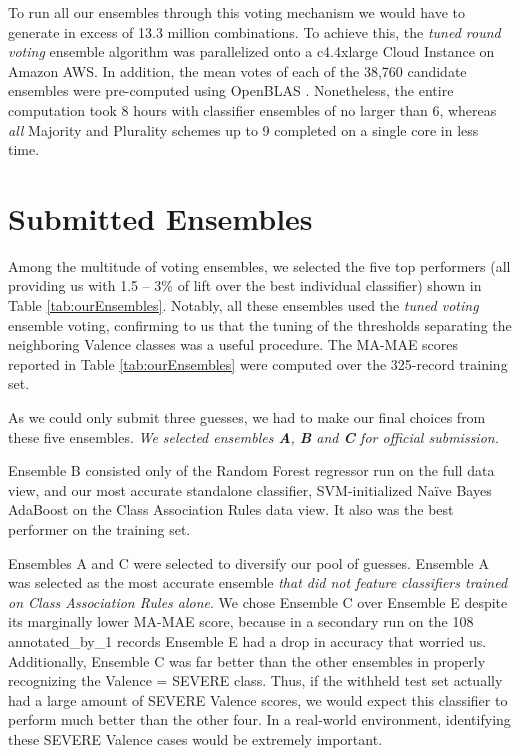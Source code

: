 To run all our ensembles through this voting mechanism we would have to generate
in excess of 13.3 million combinations. To achieve this,  the \textit{tuned round voting}
ensemble algorithm was parallelized onto a \textsf{c4.4xlarge} Cloud Instance on Amazon AWS. In addition, the mean votes of each of the 38,760 candidate ensembles were pre-computed using OpenBLAS \cite{open-blas}. Nonetheless, the entire computation took 8 hours with classifier ensembles of no larger than 6, whereas \textit{all}  Majority and Plurality schemes up to 9 completed on a single core in less time. %

\section{Submitted Ensembles}

Among the multitude of voting ensembles, we selected the five top performers (all
providing us with 1.5 -- 3\% of lift over the best individual
classifier) shown in Table \ref{tab:ourEnsembles}. Notably,
all these ensembles used the \textit{tuned voting} ensemble voting, confirming to us that the tuning of the thresholds
separating the neighboring \textsf{Valence} classes was a
useful procedure. The \textsf{MA-MAE} scores
reported in Table \ref{tab:ourEnsembles} were computed
over the 325-record training set.

As we could only submit three guesses, we had to make our final
choices from these five ensembles. 
\textit{
We selected ensembles \textbf{A}, \textbf{B} and \textbf{C} for official submission.}

\textsf{Ensemble B} consisted only of the Random Forest regressor
run on the full data view, and our most accurate standalone
classifier, SVM-initialized Na\"{i}ve Bayes AdaBoost on the Class Association
Rules data view. It also was the best performer on the training set.

\textsf{Ensembles A} and \textsf{C} were selected to diversify our 
pool of guesses. \textsf{Ensemble A} was
selected as the most accurate ensemble \textit{that did
not feature classifiers trained on Class Association Rules alone}.
We chose \textsf{Ensemble C} over \textsf{Ensemble E} despite its marginally lower MA-MAE score, because
in a secondary run on the 108 \textsf{annotated\_by\_1} records
\textsf{Ensemble E} had a drop in accuracy that worried us.
Additionally, \textsf{Ensemble C} was far better than the other
ensembles in properly recognizing the \textsf{Valence = SEVERE} class. Thus, if the withheld test set actually had a large amount of \textsf{SEVERE} Valence scores, we would expect this classifier to perform much better than the other four. In a real-world environment, identifying these \textsf{SEVERE} Valence cases would be extremely important.

